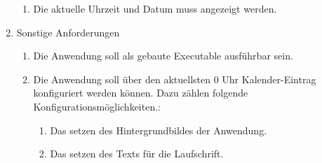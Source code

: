 \begin{enumerate}[itemsep=0em,partopsep=0em,parsep=0em,topsep=0em]
\begin{enumerate}
	\item Die aktuelle Uhrzeit und Datum muss angezeigt werden.
	\end{enumerate}
\item Sonstige Anforderungen
	\begin{enumerate}
	\item Die Anwendung soll als gebaute Executable ausführbar sein.
	\item Die Anwendung soll über den aktuellsten 0 Uhr Kalender-Eintrag konfiguriert werden können. Dazu zählen folgende Konfigurationsmöglichkeiten.:
	\begin{enumerate}
		\item Das setzen des Hintergrundbildes der Anwendung.
		\item Das setzen des Texts für die Laufschrift.
	\end{enumerate}
	\end{enumerate}
\end{enumerate}

